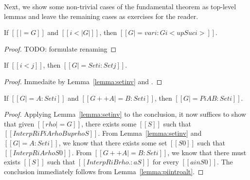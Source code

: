 \documentclass[acmsmall]{acmart}
\begin{document}
Next, we show some non-trivial cases of the fundamental theorem as
top-level lemmas and leave the remaining cases as exercises for the reader.
\begin{lemma}[ST-Var]
  \label{lemma:stvar}
  If $[[|= G]]$ and $[[i < |G|]]$, then $[[G |= var i : G i < up Suc i  >]]$.
\end{lemma}
\begin{proof}
  TODO: formulate renaming
\end{proof}

\begin{lemma}[ST-Set]
  \label{lemma:stset}
  If $[[i < j]]$, then $[[G |= Set i : Set j]]$.
\end{lemma}
\begin{proof}
  Immedaite by Lemma~\ref{lemma:setinv} and .
\end{proof}

\begin{lemma}[ST-Pi]
  \label{lemma:stpi}
  If $[[G |= A : Set i]]$ and $[[G ++ A |= B : Set i]]$, then $[[G |= Pi
  A B : Set i]]$.
\end{lemma}
\begin{proof}
  Applying Lemma~\ref{lemma:setinv} to the
  conclusion, it now suffices to show that given $[[rho |= G]]$, there
  exists some $[[S]]$ such that $[[InterpR i Pi A{rho} B{up rho} S]]$.
  From Lemma~\ref{lemma:setinv} and $[[G |= A : Set i]]$, we know that
  there exists some set $[[S0]]$ such that $[[InterpR i A {rho} S0]]$.
From $[[G ++ A |= B : Set i]]$, we know that there must
exists $[[S]]$ such that $[[InterpR i B {rho .: a} S]]$ for every $[[a
in S0]]$. The conclusion immediately follows from Lemma~\ref{lemma:piintroalt}.
\end{proof}
\end{document}
